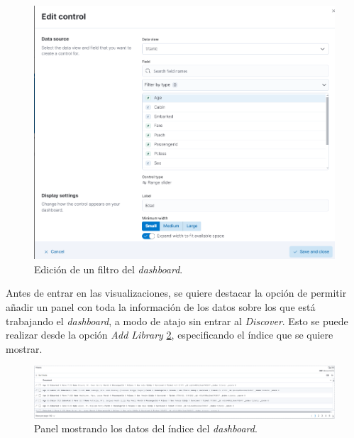 \begin{figure}
    \centering
    \includegraphics[width=1\linewidth]{img/kibana10.png}
    \caption{Edición de un filtro del \textit{dashboard}.}
    \label{fig:kibana10}
\end{figure}

Antes de entrar en las visualizaciones, se quiere destacar la opción de permitir añadir un panel con toda la información de los datos sobre los que está trabajando el \textit{dashboard}, a modo de atajo sin entrar al \textit{Discover}. Esto se puede realizar desde la opción \textit{Add Library} \ref{fig:kibana11}, especificando el índice que se quiere mostrar.

\begin{figure}
    \centering
    \includegraphics[width=1\linewidth]{img/kibana11.png}
    \caption{Panel mostrando los datos del índice del \textit{dashboard}.}
    \label{fig:kibana11}
\end{figure}

\paragraph{}
\paragraph{}


